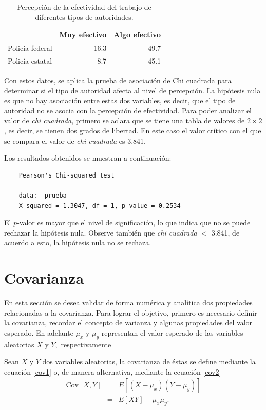 \documentclass[12pt]{article}
\begin{document}
	\begin{table}[h]
		\centering
		\caption{Percepción de la efectividad del trabajo de diferentes tipos de autoridades.}
		\label{dtaos-chi}
		\begin{tabular}{lrr}
			\hline
			& Muy efectivo & Algo efectivo\\
			\hline
			Policía federal & 16.3 & 49.7 \\
			Policía estatal & 8.7 & 45.1 \\
			\hline
		\end{tabular}
	\end{table}
	
	Con estos datos, se aplica la prueba de asociación de Chi cuadrada para determinar si el tipo de autoridad afecta al nivel de percepción. La hipótesis nula es que no hay asociación entre estas dos variables, es decir, que el tipo de autoridad no se asocia con la percepción de efectividad. Para poder analizar el valor de {\em chi cuadrada}, primero se aclara que se tiene una tabla de valores de $2 \times 2$, es decir, se tienen dos grados de libertad. En este caso el valor crítico con el que se compara el valor de {\em chi cuadrada} es 3.841. 
	
	Los resultados obtenidos se muestran a continuación:
	\begin{verbatim}
	Pearson's Chi-squared test
	
	data:  prueba
	X-squared = 1.3047, df = 1, p-value = 0.2534
	\end{verbatim}
	
	El $p$-valor es mayor que el nivel de significación, lo que indica que no se puede rechazar la hipótesis nula. Observe también que {\em chi cuadrada} $<$ 3.841, de acuerdo a esto, la hipótesis nula no se rechaza.
	
	\section{Covarianza} \label{covarianza}
	
	En esta sección se desea validar de forma numérica y analítica dos propiedades relacionadas a la covarianza. Para lograr el objetivo, primero es necesario definir la covarianza, recordar el concepto de varianza y algunas propiedades del valor esperado. En adelante $\mu_x$ y $\mu_y$ representan el valor esperado de las variables aleatorias $X$ y $Y,$ respectivamente
	
	Sean $X$ y $Y$ dos variables aleatorias, la covarianza de éstas se define mediante la ecuación \ref{cov1} o, de manera alternativa, mediante la ecuación \ref{cov2}
	\begin{eqnarray}
	\text{Cov}[X,Y] &=& E[(X-\mu_x)(Y-\mu_y)] 	\label{cov1} \\
	&=& E[XY] - \mu_x\mu_y. \label{cov2}
	\end{eqnarray}	
	
\end{document}
